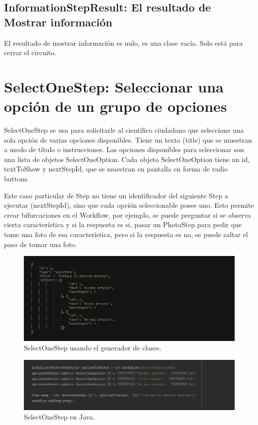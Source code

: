 \subsection{InformationStepResult: El resultado de Mostrar información}
El resultado de mostrar información es nulo, es una clase vacía. Solo está para cerrar el circuito.





\section{SelectOneStep: Seleccionar una opción de un grupo de opciones}
SelectOneStep  se usa para solicitarle al científico ciudadano que seleccione una sola opción de varias opciones disponibles. Tiene un texto (title) que se muestran a modo de título o instrucciones. Las opciones disponibles para seleccionar son una lista de objetos SelectOneOption.
Cada objeto SelectOneOption tiene un id, textToShow y nextStepId, que se muestran en pantalla en forma de radio buttons.

Este caso particular de Step no tiene un identificador del siguiente Step a ejecutar (nextStepId), sino que cada opción seleccionable posee uno. Esto permite crear bifurcaciones en el Workflow, por ejemplo, se puede preguntar si se observa cierta característica y si la respuesta es si, pasar un PhotoStep para pedir que tome una foto de esa característica, pero si la respuesta es no, se puede saltar el paso de tomar una foto.

\begin{figure}[H]
  \centering
    \includegraphics[scale=0.6]{50-anexos/C-steps/select_one_json.png} 
    \caption{SelectOneStep usando el generador de clases.}
\end{figure}	

\begin{figure}[H]
  \centering
    \includegraphics[scale=0.6]{50-anexos/C-steps/select_one_java.png} 
    \caption{SelectOneStep en Java.}
\end{figure}

